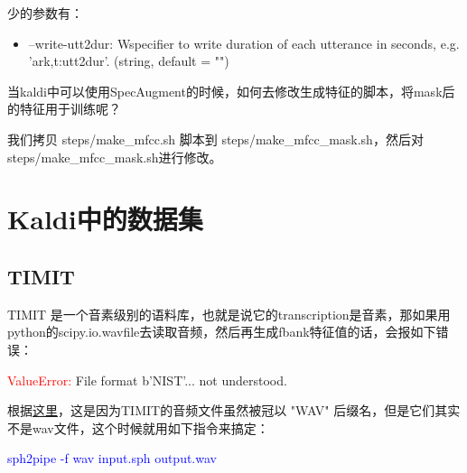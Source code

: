 少的参数有：
\begin{itemize}
  \item --write-utt2dur: Wspecifier to write duration of each utterance in seconds, e.g. 'ark,t:utt2dur'. (string, default = "")
\end{itemize}


当kaldi中可以使用SpecAugment的时候，如何去修改生成特征的脚本，将mask后的特征用于训练呢？

我们拷贝 steps/make\_mfcc.sh 脚本到 steps/make_mfcc_mask.sh，然后对 steps/make\_mfcc\_mask.sh进行修改。


\section{Kaldi中的数据集}
\subsection{TIMIT}
TIMIT 是一个音素级别的语料库，也就是说它的transcription是音素，那如果用python的scipy.io.wavfile去读取音频，然后再生成fbank特征值的话，会报如下错误：

\textcolor{red}{ValueError: }File format b'NIST'... not understood.

根据\href{https://stackoverflow.com/questions/44748258/reading-a-wav-file-from-timit-database-in-python}{这里}，这是因为TIMIT的音频文件虽然被冠以 "WAV" 后缀名，但是它们其实不是wav文件，这个时候就用如下指令来搞定：

\textcolor{blue}{sph2pipe -f wav input.sph output.wav}

